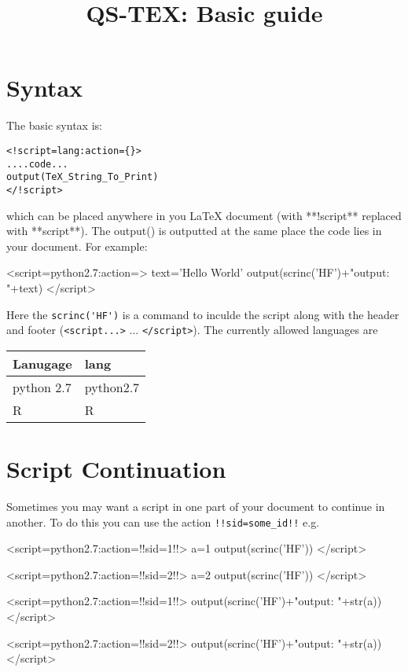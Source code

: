 \documentclass[a4paper,12pt,twocolum]{article}
\title{QS-TEX: Basic guide}
\begin{document}
\maketitle
\section{Syntax}
The basic syntax is:
\begin{lstlisting}
<!script=lang:action={}>
....code...
output(TeX_String_To_Print)
</!script>
\end{lstlisting}
which can be placed anywhere in you LaTeX document (with **!script** replaced with **script**). The output() is outputted at the same place the code lies in your document.  For example:

<script=python2.7:action={}>
text='Hello World'
output(scrinc('HF')+"output: "+text)
</script>

Here the \lstinline{scrinc('HF')} is a command to inculde the script along with the header and footer (\lstinline{<script...>} ... \lstinline{</script>}). The currently allowed languages are
\\
\begin{center}
\begin{tabular}{|p{1in}|p{1in}|}
\hline
\textbf{Lanugage} & \textbf{lang} \\ \hline
python 2.7 & python2.7\\ \hline
R&R\\ \hline
\end{tabular}
\end{center}
\section{Script Continuation}
Sometimes you may want a script in one part of your document to continue in another. To do this you can use the action \lstinline{!!sid=some_id!!} e.g.

<script=python2.7:action={!!sid=1!!}>
a=1
output(scrinc('HF'))
</script>

<script=python2.7:action={!!sid=2!!}>
a=2
output(scrinc('HF'))
</script>

<script=python2.7:action={!!sid=1!!}>
output(scrinc('HF')+"output: "+str(a))
</script>

<script=python2.7:action={!!sid=2!!}>
output(scrinc('HF')+"output: "+str(a))
</script>
\end{document}
